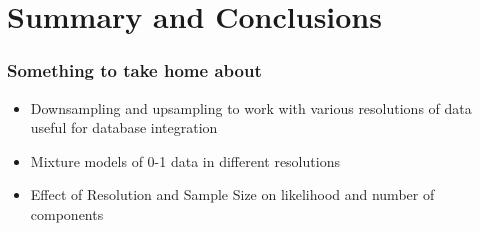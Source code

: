 \documentclass[dvips]{beamer}
\begin{document}


\section{Summary and Conclusions}
\begin{frame}
 \frametitle{Something to take home about}
 \begin{itemize}
      \item Downsampling and upsampling to work with various resolutions of data useful for database integration
      \item Mixture models of 0-1 data in different resolutions
      \item Effect of Resolution and Sample Size on likelihood and number of components
 \end{itemize}
\end{frame}
\end{document}
